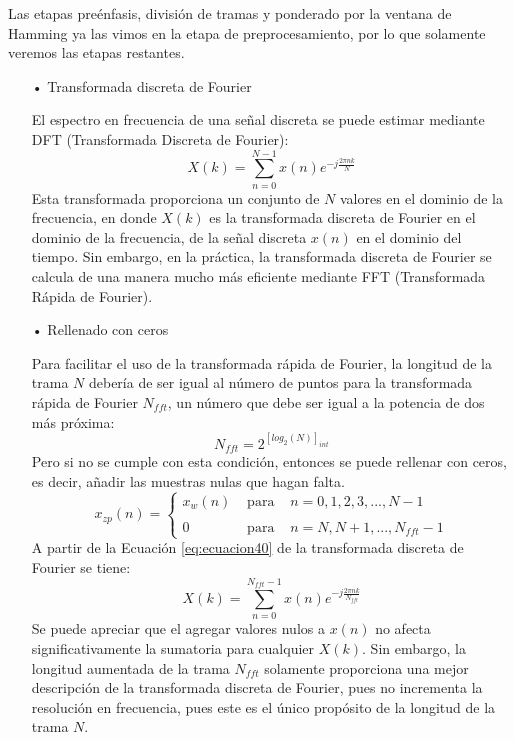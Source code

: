 \begin{enumerate}
Las etapas preénfasis, división de tramas y ponderado por la ventana de Hamming ya las vimos en la etapa de preprocesamiento, por lo que solamente veremos las etapas restantes.

\newpage
\begin{enumerate}
\item[•]Transformada discreta de Fourier
\par
El espectro en frecuencia de una señal discreta se puede estimar mediante DFT (Transformada Discreta de Fourier):
\begin{equation}
\label{eq:ecuacion40}
X(k) = \sum_{n=0}^{N-1}x(n)e^{-j\frac{2\pi nk}{N}}
\end{equation}
Esta transformada proporciona un conjunto de $N$ valores en el dominio de la frecuencia, en donde $X(k)$ es la transformada discreta de Fourier en el dominio de la frecuencia, de la señal discreta $x(n)$ en el dominio del tiempo. Sin embargo, en la práctica, la transformada discreta de Fourier se calcula de una manera mucho más eficiente mediante FFT (Transformada Rápida de Fourier).

\item[•]Rellenado con ceros
\par
Para facilitar el uso de la transformada rápida de Fourier, la longitud de la trama $N$ debería de ser igual al número de puntos para la transformada rápida de Fourier $N_{fft}$, un número que debe ser igual a la potencia de dos más próxima:
\begin{equation}
\label{eq:ecuacion41}
N_{fft} = 2^{[log_{2}(N)]_{int}}
\end{equation}
Pero si no se cumple con esta condición, entonces se puede rellenar con ceros, es decir, añadir las muestras nulas que hagan falta.
\vskip 0.5cm
\begin{equation}
\label{eq:ecuacion42}
x_{zp}(n)= \left\{ \begin{array}{lcl}
x_{w}(n) & \mbox{ para } & n = 0,1,2,3,...,N-1 \\
& & \\
0 & \mbox{ para } & n = N,N+1,...,N_{fft} - 1
\end{array}
\right.
\end{equation}
\vskip 0.5cm
A partir de la Ecuación \eqref{eq:ecuacion40} de la transformada discreta de Fourier se tiene:
\begin{equation}
\label{eq:ecuacion43}
X(k) = \sum_{n=0}^{N_{fft}-1}x(n)e^{-j\frac{2\pi nk}{N_{fft}}}
\end{equation}
Se puede apreciar que el agregar valores nulos a $x(n)$ no afecta significativamente la sumatoria para cualquier $X(k)$. Sin embargo, la longitud aumentada de la trama $N_{fft}$ solamente proporciona una mejor descripción de la transformada discreta de Fourier, pues no incrementa la resolución en frecuencia, pues este es el único propósito de la longitud de la trama $N$.


\end{enumerate}
\end{enumerate}
